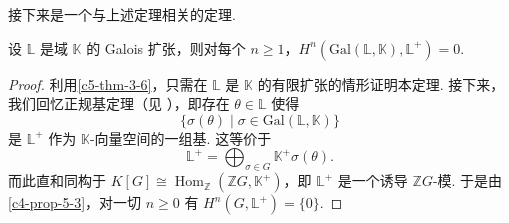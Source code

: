 接下来是一个与上述定理相关的定理.

\begin{theorem}\label{c5-thm-4-7}
设 $\mathbb{L}$ 是域 $\mathbb{K}$ 的 Galois 扩张，则对每个 $n\geq 1$，$H^n(\mathrm{Gal}(\mathbb{L},\mathbb{K}),\mathbb{L}^+)=0$.
\end{theorem}

\begin{proof}
利用\autoref{c5-thm-3-6}，只需在 $\mathbb{L}$ 是 $\mathbb{K}$ 的有限扩张的情形证明本定理. 接下来，我们回忆正规基定理（见 \cite[Theorem~13.1, \S13, Chapter~VI]{lang02a}），即存在 $\theta\in\mathbb{L}$ 使得
\[
\{\sigma(\theta)\mid\sigma\in\mathrm{Gal}(\mathbb{L},\mathbb{K})\}
\]
是 $\mathbb{L}^+$ 作为 $\mathbb{K}$-向量空间的一组基. 这等价于
\[
\mathbb{L}^+=\bigoplus_{\sigma\in G}\mathbb{K}^+\sigma(\theta).
\]
而此直和同构于 $K[G]\cong\operatorname{Hom}_{\mathbb{Z}}(\mathbb{Z}G,\mathbb{K}^+)$，即 $\mathbb{L}^+$ 是一个诱导 $\mathbb{Z}G$-模. 于是由\autoref{c4-prop-5-3}，对一切 $n\geq 0$ 有 $H^n(G,\mathbb{L}^+)=\{0\}$.
\end{proof}

